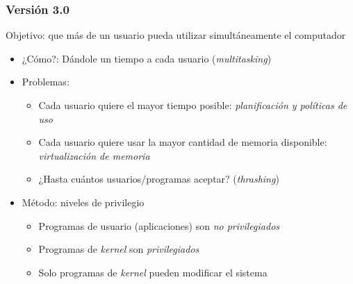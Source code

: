 \documentclass[letter]{beamer}
\begin{document}
\begin{frame}
  \frametitle{Versión 3.0}

  Objetivo: que más de un usuario pueda utilizar simultáneamente el computador
  \begin{itemize}
  \item<2-> ¿Cómo?: Dándole un tiempo a cada usuario ({\em multitasking})
  \item<3-> Problemas:
    \begin{itemize}
      \item Cada usuario quiere el mayor tiempo posible: {\em planificación y políticas de uso}
      \item Cada usuario quiere usar la mayor cantidad de memoria disponible: {\em virtualización de memoria}
      \item ¿Hasta cuántos usuarios/programas aceptar? ({\em thrashing})
    \end{itemize}
  \item<4-> Método: niveles de privilegio
    \begin{itemize}
      \item Programas de usuario (aplicaciones) son {\em no privilegiados}
      \item Programas de {\em kernel} son {\em privilegiados}
      \item Solo programas de {\em kernel} pueden modificar el sistema
    \end{itemize}
  \end{itemize}
\end{frame}



\end{document}
